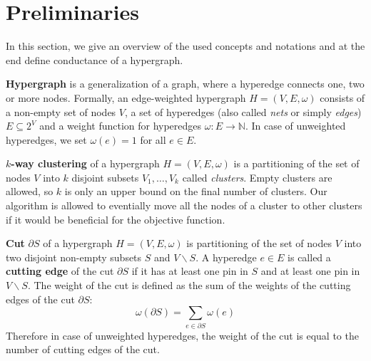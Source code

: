 \documentclass[acmsmall,nonacm,screen,review]{acmart}
\begin{document}


\section{Preliminaries}
\label{sec:preliminaries}

In this section, we give an overview of the used concepts and 
notations and at the end define conductance of a hypergraph.

\smallbreak
\noindent\textbf{Hypergraph} is a generalization of a graph, where a 
hyperedge connects one, two or more nodes. Formally, an edge-weighted 
hypergraph $H = (V, E, \omega)$ consists of a non-empty set of nodes 
$V$, a set of hyperedges (also called \textit{nets} or simply 
\textit{edges}) $E \subseteq 2^V$ and a weight function for 
hyperedges $\omega: E \to \mathbb{N}$. In case of unweighted 
hyperedges, we set $\omega(e) = 1$ for all $e \in E$. 

\smallbreak
\noindent\textbf{$k$-way clustering} of a hypergraph 
$H = (V, E,\omega)$ is a partitioning of the set of nodes $V$ into 
$k$ disjoint subsets $V_1, \dots, V_k$ called \textit{clusters}. Empty 
clusters are allowed, so $k$ is only an upper bound on the final 
number of clusters. Our algorithm is allowed to eventially move all 
the nodes of a cluster to other clusters if it would be beneficial 
for the objective function. 

\smallbreak
\noindent\textbf{Cut} $\partial S$ of a hypergraph 
$H = (V, E, \omega)$ is partitioning of the set of nodes $V$ into 
two disjoint non-empty subsets $S$ and $V \backslash S$. A hyperedge 
$e \in E$ is called a \textbf{cutting edge} of the cut $\partial S$ 
if it has at least one pin in $S$ and at least one pin in 
$V \backslash S$. The weight of the cut is defined as the sum of the 
weights of the cutting edges of the cut $\partial S$: 
\[\omega(\partial S) = \sum_{e \in \partial S} \omega(e)\]
Therefore in case of unweighted hyperedges, the weight of the cut is 
equal to the number of cutting edges of the cut.
\end{document}
